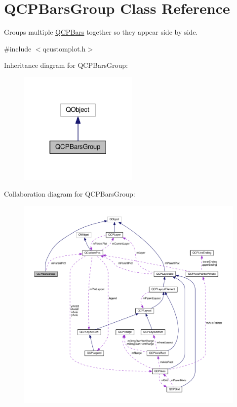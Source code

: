 \hypertarget{classQCPBarsGroup}{}\section{Q\+C\+P\+Bars\+Group Class Reference}
\label{classQCPBarsGroup}


Groups multiple \hyperlink{classQCPBars}{Q\+C\+P\+Bars} together so they appear side by side.  




{\ttfamily \#include $<$qcustomplot.\+h$>$}



Inheritance diagram for Q\+C\+P\+Bars\+Group\+:
\nopagebreak
\begin{figure}[H]
\begin{center}
\leavevmode
\includegraphics[width=165pt]{classQCPBarsGroup__inherit__graph}
\end{center}
\end{figure}


Collaboration diagram for Q\+C\+P\+Bars\+Group\+:
\nopagebreak
\begin{figure}[H]
\begin{center}
\leavevmode
\includegraphics[width=350pt]{classQCPBarsGroup__coll__graph}
\end{center}
\end{figure}
